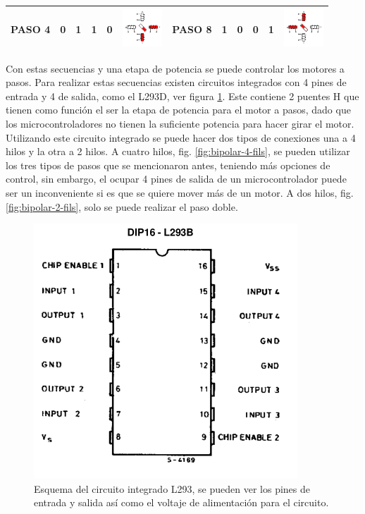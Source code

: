 \begin{table}
\begin{tabular}{|c|c|c|c|c|c|c|c|c|c|c|c|}
		\hline 
		PASO 4 & 0 & 1 & 1 & 0 & \includegraphics[width=15mm]{Imagenes/2/paso2_5} &	PASO 8  & 1 & 0 & 0 & 1 & \includegraphics[width=15mm]{Imagenes/2/paso4_5} \\ 
		\hline 
	\end{tabular} 
\end{table}

Con estas secuencias y una etapa de potencia se puede controlar los motores a pasos. Para realizar estas secuencias existen circuitos integrados con 4 pines de entrada y 4 de salida, como el L293D, ver figura \ref{fig:l293}. Este contiene 2 puentes H que tienen como función el ser la etapa de potencia para el motor a pasos, dado que los microcontroladores no tienen la suficiente potencia para hacer girar el motor.
Utilizando este circuito integrado se puede hacer dos tipos de conexiones una a 4 hilos y la otra a 2 hilos. A cuatro hilos, fig. \ref{fig:bipolar-4-fils}, se pueden utilizar los tres tipos de pasos que se mencionaron antes, teniendo más opciones de control, sin embargo, el ocupar 4 pines de salida de un microcontrolador puede ser un inconveniente si es que se quiere mover más de un motor. A dos hilos, fig. \ref{fig:bipolar-2-fils}, solo se puede realizar el paso doble. %

\begin{figure}[h!]
	\centering
	\includegraphics[width=0.4\linewidth]{Imagenes/2/L293}
	\caption[Esquema del circuito integrado L293]{Esquema del circuito integrado L293, se pueden ver los pines de entrada y salida así como el voltaje de alimentación para el circuito. \cite{L2931986}}
	\label{fig:l293}
\end{figure}


